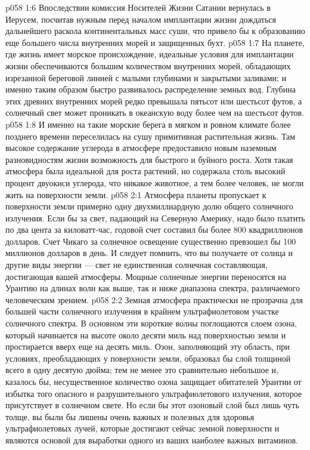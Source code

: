 \vs p058 1:6 Впоследствии комиссия Носителей Жизни Сатании вернулась в Иерусем, посчитав нужным перед началом имплантации жизни дождаться дальнейшего раскола континентальных масс суши, что привело бы к образованию еще большего числа внутренних морей и защищенных бухт.
\vs p058 1:7 \pc На планете, где жизнь имеет морское происхождение, идеальные условия для имплантации жизни обеспечиваются большим количеством внутренних морей, обладающих изрезанной береговой линией с малыми глубинами и закрытыми заливами; и именно таким образом быстро развивалось распределение земных вод. Глубина этих древних внутренних морей редко превышала пятьсот или шестьсот футов, а солнечный свет может проникать в океанскую воду более чем на шестьсот футов.
\vs p058 1:8 И именно на такие морские берега в мягком и ровном климате более позднего времени переселилась на сушу примитивная растительная жизнь. Там высокое содержание углерода в атмосфере предоставило новым наземным разновидностям жизни возможность для быстрого и буйного роста. Хотя такая атмосфера была идеальной для роста растений, но содержала столь высокий процент двуокиси углерода, что никакое животное, а тем более человек, не могли жить на поверхности земли.
\vs p058 2:1 Атмосфера планеты пропускает к поверхности земли примерно одну двухмиллиардную долю общего солнечного излучения. Если бы за свет, падающий на Северную Америку, надо было платить по два цента за киловатт\hyp{}час, годовой счет составил бы более 800 квадриллионов долларов. Счет Чикаго за солнечное освещение существенно превзошел бы 100 миллионов долларов в день. И следует помнить, что вы получаете от солнца и другие виды энергии --- свет не единственная солнечная составляющая, достигающая вашей атмосферы. Мощные солнечные энергии переносятся на Урантию на длинах волн как выше, так и ниже диапазона спектра, различаемого человеческим зрением.
\vs p058 2:2 \pc Земная атмосфера практически не прозрачна для большей части солнечного излучения в крайнем ультрафиолетовом участке солнечного спектра. В основном эти короткие волны поглощаются слоем озона, который начинается на высоте около десяти миль над поверхностью земли и простирается вверх еще на десять миль. Озон, заполняющий эту область, при условиях, преобладающих у поверхности земли, образовал бы слой толщиной всего в одну десятую дюйма; тем не менее это сравнительно небольшое и, казалось бы, несущественное количество озона защищает обитателей Урантии от избытка того опасного и разрушительного ультрафиолетового излучения, которое присутствует в солнечном свете. Но если бы этот озоновый слой был лишь чуть толще, вы были бы лишены очень важных и полезных для здоровья ультрафиолетовых лучей, которые достигают сейчас земной поверхности и являются основой для выработки одного из ваших наиболее важных витаминов.
